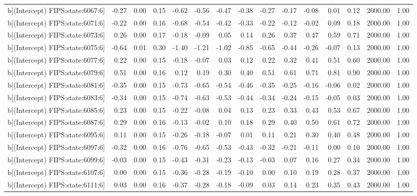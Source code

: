 \begin{table}[ht]
\begin{tabular}{rrrrrrrrrrrrrrr}
  b[(Intercept) FIPS:state:6067:6] & -0.27 & 0.00 & 0.15 & -0.62 & -0.56 & -0.47 & -0.38 & -0.27 & -0.17 & -0.08 & 0.01 & 0.12 & 2000.00 & 1.00 \\ 
  b[(Intercept) FIPS:state:6071:6] & -0.22 & 0.00 & 0.16 & -0.68 & -0.54 & -0.42 & -0.33 & -0.22 & -0.12 & -0.02 & 0.09 & 0.18 & 2000.00 & 1.00 \\ 
  b[(Intercept) FIPS:state:6073:6] & 0.26 & 0.00 & 0.17 & -0.18 & -0.09 & 0.05 & 0.14 & 0.26 & 0.37 & 0.47 & 0.59 & 0.71 & 2000.00 & 1.00 \\ 
  b[(Intercept) FIPS:state:6075:6] & -0.64 & 0.01 & 0.30 & -1.40 & -1.21 & -1.02 & -0.85 & -0.65 & -0.44 & -0.26 & -0.07 & 0.13 & 2000.00 & 1.00 \\ 
  b[(Intercept) FIPS:state:6077:6] & 0.22 & 0.00 & 0.15 & -0.18 & -0.07 & 0.03 & 0.12 & 0.22 & 0.32 & 0.41 & 0.51 & 0.60 & 2000.00 & 1.00 \\ 
  b[(Intercept) FIPS:state:6079:6] & 0.51 & 0.00 & 0.16 & 0.12 & 0.19 & 0.30 & 0.40 & 0.51 & 0.61 & 0.71 & 0.81 & 0.90 & 2000.00 & 1.00 \\ 
  b[(Intercept) FIPS:state:6081:6] & -0.35 & 0.00 & 0.15 & -0.73 & -0.65 & -0.54 & -0.46 & -0.35 & -0.25 & -0.16 & -0.06 & 0.02 & 2000.00 & 1.00 \\ 
  b[(Intercept) FIPS:state:6083:6] & -0.34 & 0.00 & 0.15 & -0.74 & -0.63 & -0.53 & -0.44 & -0.34 & -0.24 & -0.15 & -0.05 & 0.03 & 2000.00 & 1.00 \\ 
  b[(Intercept) FIPS:state:6085:6] & 0.23 & 0.00 & 0.15 & -0.22 & -0.08 & 0.04 & 0.13 & 0.23 & 0.33 & 0.43 & 0.53 & 0.67 & 2000.00 & 1.00 \\ 
  b[(Intercept) FIPS:state:6087:6] & 0.29 & 0.00 & 0.16 & -0.13 & -0.02 & 0.10 & 0.18 & 0.29 & 0.40 & 0.50 & 0.61 & 0.72 & 2000.00 & 1.00 \\ 
  b[(Intercept) FIPS:state:6095:6] & 0.11 & 0.00 & 0.15 & -0.26 & -0.18 & -0.07 & 0.01 & 0.11 & 0.21 & 0.30 & 0.40 & 0.48 & 2000.00 & 1.00 \\ 
  b[(Intercept) FIPS:state:6097:6] & -0.32 & 0.00 & 0.16 & -0.76 & -0.65 & -0.53 & -0.43 & -0.32 & -0.21 & -0.11 & 0.00 & 0.10 & 2000.00 & 1.00 \\ 
  b[(Intercept) FIPS:state:6099:6] & -0.03 & 0.00 & 0.15 & -0.43 & -0.31 & -0.23 & -0.13 & -0.03 & 0.07 & 0.16 & 0.27 & 0.34 & 2000.00 & 1.00 \\ 
  b[(Intercept) FIPS:state:6107:6] & 0.00 & 0.00 & 0.15 & -0.36 & -0.28 & -0.19 & -0.10 & 0.00 & 0.10 & 0.19 & 0.28 & 0.37 & 2000.00 & 1.00 \\ 
  b[(Intercept) FIPS:state:6111:6] & 0.03 & 0.00 & 0.16 & -0.37 & -0.28 & -0.18 & -0.09 & 0.03 & 0.14 & 0.23 & 0.35 & 0.43 & 2000.00 & 1.00 \\ 

\end{tabular}
\end{table}

